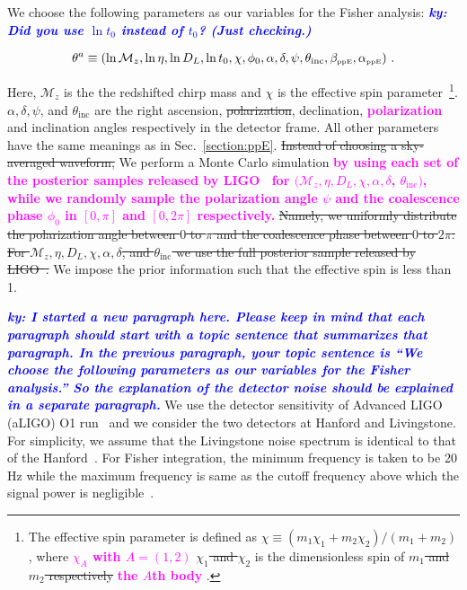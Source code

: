 \documentclass[prd,twocolumn,nofootinbib]{revtex4-1}
\newcommand\ba{\begin{eqnarray}}
\newcommand\ea{\end{eqnarray}}
\newcommand\bw{\begin{widetext}}
\newcommand\ew{\end{widetext}}
\newcommand{\lb}{\left(}
\newcommand{\rb}{\right)}
\newcommand{\PPE}{{\mbox{\tiny ppE}}}
\newcommand{\ky}[1]{\textcolor{blue}{\it{\textbf{ky: #1}}} }
\newcommand{\kent}[1]{\textcolor{magenta}{\textbf{#1}} }
\begin{document}
We choose the following parameters as our variables for the Fisher analysis: \ky{Did you use $\ln t_0$ instead of $t_0$? (Just checking.)}
\bw
\ba
\theta^a\equiv \lb \ln{\mathcal{M}_z}, \ln{\eta}, \ln{D_L}, \ln{t_0}, \chi, \phi_0, \alpha, \delta, \psi, \theta_{\text{inc}}, \beta_{\PPE}, \alpha_{\PPE} \rb\,.
\ea
\ew
Here, $\mathcal{M}_z$ is the the redshifted chirp mass and $\chi$ is the effective spin parameter~\footnote{The effective spin parameter is defined as $\chi\equiv\lb m_1 \chi_1+m_2\chi_2\rb /\lb m_1+m_2\rb$, where \kent{$\chi_A$ with $A=(1,2)$} \sout{$\chi_1$ and $\chi_2$} is the dimensionless spin of \sout{$m_1$ and $m_2$ respectively} \kent{the $A$th body}.}. $\alpha, \delta, \psi$, and  $\theta_{\text{inc}}$ are the right ascension, \sout{polarization}, declination, \kent{polarization} and inclination angles respectively in the detector frame. All other parameters have the same meanings as in Sec.~\ref{section:ppE}. 
\sout{Instead of choosing a sky-averaged waveform,} We perform a Monte Carlo simulation \kent{by using each set of the posterior samples released by LIGO~\cite{ligo:sample} for $(\mathcal{M}_z, \eta, D_L, \chi, \alpha, \delta$, $\theta_{\text{inc}})$, while we randomly sample the polarization angle $\psi$ and the coalescence phase $\phi_0$ in $[0,\pi]$ and $[0,2\pi]$ respectively.}
\sout{Namely, we uniformly distribute the polarization angle between $0$ to $\pi$ and the coalescence phase between $0$ to $2\pi$. For $\mathcal{M}_z, \eta, D_L, \chi, \alpha, \delta$, and $\theta_{\text{inc}}$ we use the full posterior sample released by LIGO~\cite{ligo:sample}. }
We impose the prior information such that the effective spin is less than 1.

\ky{I started a new paragraph here. Please keep in mind that each paragraph should start with a topic sentence that summarizes that paragraph. In the previous paragraph, your topic sentence is ``We choose the following parameters as our variables for the Fisher analysis.'' So the explanation of the detector noise should be explained in a separate paragraph.}
We use the detector sensitivity of Advanced LIGO (aLIGO) O1 run~\cite{LIGOScientific:2018mvr} and we consider the two detectors at Hanford and Livingstone. For simplicity, we assume that the Livingstone noise spectrum is identical to that of the Hanford~\cite{Yunes:2009yz}. For Fisher integration, the minimum frequency is taken to be 20 Hz while the maximum frequency is same as the cutoff frequency above which the signal power is negligible~\cite{Ajith:2009bn}.
\end{document}
